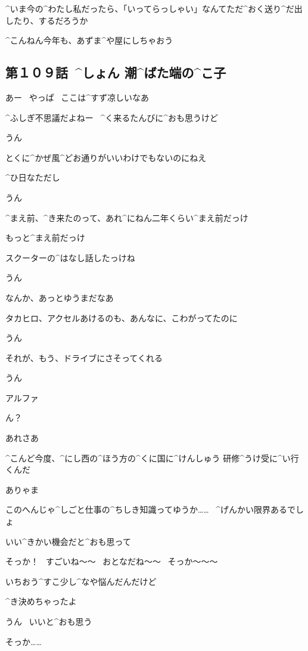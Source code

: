 \page
\A ^{いま}{今}の^{わたし}{私}だったら、「いってらっしゃい」なんてただ^{おく}{送}り^{だ}{出}したり、するだろうか

\page[132]
\A ^{こんねん}{今年}も、あずま^{や}{屋}にしちゃおう


\subsection{第１０９話\ ^{しょん }{潮}^{ばた}{端}の^{こ}{子}}

\page[137]
\A あー
\ やっぱ
\ ここは^{すず}{凉}しいなあ

\A ^{ふしぎ}{不思議}だよねー
\ ^{く}{来}るたんびに^{おも}{思}うけど

\T うん

\A とくに^{かぜ}{風}^{どお}{通}りがいいわけでもないのにねえ

\A ^{ひ}{日}なただし

\T うん

\page
\A ^{まえ}{前}、^{き}{来}たのって、あれ^{にねん}{二年}くらい^{まえ}{前}だっけ

\A もっと^{まえ}{前}だっけ

\A スクーターの^{はなし}{話}したっけね

\T うん

\page
\A なんか、あっとゆうまだなあ

\A タカヒロ、アクセルあけるのも、あんなに、こわがってたのに

\T うん

\A それが、もう、ドライブにさそってくれる

\T うん

\page
\T アルファ

\A ん？

\T あれさあ

\T ^{こんど}{今度}、^{にし}{西}の^{ほう}{方}の^{くに}{国}に^{けんしゅう }{研修}^{うけ}{受}に^{い}{行}くんだ

\A ありゃま

\T このへんじゃ^{しごと}{仕事}の^{ちしき}{知識}ってゆうか……
\ ^{げんかい}{限界}あるでしょ

\T いい^{きかい}{機会}だと^{おも}{思}って

\A そっか！
\ すごいね〜〜
\ おとなだね〜〜
\ そっか〜〜〜

\page
\T いちおう^{すこ}{少}し^{なや}{悩}んだんだけど

\T ^{き}{決}めちゃったよ

\A うん
\ いいと^{おも}{思}う

\A そっか……

